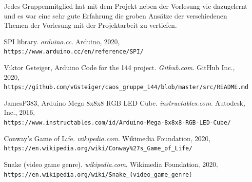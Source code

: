 \documentclass[12pt,a4paper]{article}
\begin{document}
Jedes Gruppenmitglied hat mit dem Projekt neben der Vorlesung vie dazugelernt und es war eine sehr gute Erfahrung die groben Ansätze
der verschiedenen Themen der Vorlesung mit der Projektarbeit zu vertiefen.


\newpage

\begin{thebibliography}{9}
	SPI library.
	\textit{arduino.cc}.
	Arduino, 2020,
	\\\texttt{https://www.arduino.cc/en/reference/SPI/}
	
	Viktor Gsteiger, Arduino Code for the 144 project.
	\textit{Github.com}.
	GitHub Inc., 2020,
	\\\texttt{https://github.com/vGsteiger/caos\_gruppe\_144/blob/master/src/README.md}
	
	JamesP383, Arduino Mega 8x8x8 RGB LED Cube. 
	\textit{instructables.com}. 
	Autodesk, Inc., 2016,
	\\\texttt{https://www.instructables.com/id/Arduino-Mega-8x8x8-RGB-LED-Cube/}
	
	Conway's Game of Life. 
	\textit{wikipedia.com}. 
	Wikimedia Foundation, 2020,
	\\\texttt{https://en.wikipedia.org/wiki/Conway\%27s\_Game\_of\_Life/}
	
	Snake (video game genre). 
	\textit{wikipedia.com}. 
	Wikimedia Foundation, 2020,
	\\\texttt{https://en.wikipedia.org/wiki/Snake\_(video\_game\_genre)}
	
	
\end{thebibliography}
\end{document}
